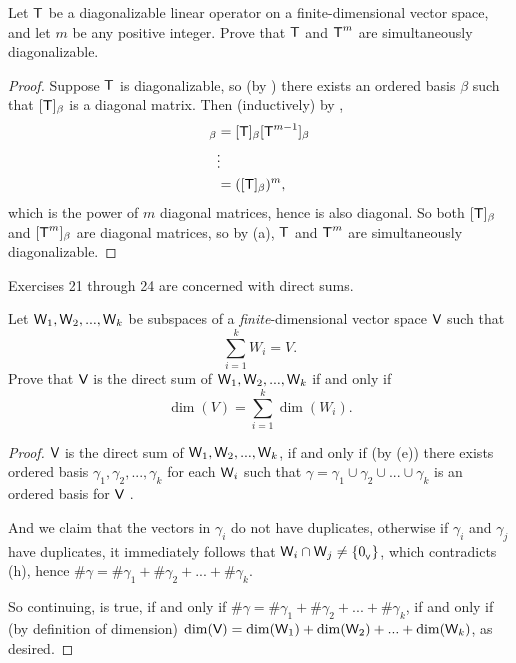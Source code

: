 \begin{exercise} \label{exercise 5.2.20}
Let \(\textsf{T}\) be a diagonalizable linear operator on a finite-dimensional vector space, and let \(m\) be any positive integer.
Prove that \(\textsf{T}\) and \(\textsf{T}^m\) are simultaneously diagonalizable.
\end{exercise}

\begin{proof}
Suppose \(\textsf{T}\) is diagonalizable, so (by ) there exists an ordered basis \(\beta\) such that \([\textsf{T}]_{\beta}\) is a diagonal matrix.
Then (inductively) by ,
\begin{align*}
    [\T^m]_{\beta} & = [\T]_{\beta} [\T^{m - 1}]_{\beta} \\
        & \vdots \\
        & = ([\T]_{\beta})^m,
\end{align*}
which is the power of \(m\) diagonal matrices, hence is also diagonal.
So both \([\textsf{T}]_{\beta}\) and \([\textsf{T}^m]_{\beta}\) are diagonal matrices, so by (a), \(\textsf{T}\) and \(\textsf{T}^m\) are simultaneously diagonalizable.
\end{proof}

Exercises 21 through 24 are concerned with direct sums.

\begin{exercise} \label{exercise 5.2.21}
Let \(\textsf{W}_1, \textsf{W}_2, ..., \textsf{W}_k\) be subspaces of a \emph{finite}-dimensional vector space \(\textsf{V}\) such that
\[
    \sum_{i = 1}^k W_i = V.
\]
Prove that \(\textsf{V}\) is the direct sum of \(\textsf{W}_1, \textsf{W}_2, ..., \textsf{W}_k\) if and only if
\[
    \dim(V) = \sum_{i = 1}^k \dim(W_i).
\]
\end{exercise}

\begin{proof}
\(\textsf{V}\) is the direct sum of \(\textsf{W}_1, \textsf{W}_2, ..., \textsf{W}_k\),
if and only if (by (e)) there exists ordered basis \(\gamma_1, \gamma_2, ..., \gamma_k\) for each \(\textsf{W}_i\) such that \(\gamma = \gamma_1 \cup \gamma_2 \cup ... \cup \gamma_k\) is an ordered basis for \(\textsf{V}\) .

And we claim that the vectors in \(\gamma_i\) do not have duplicates, otherwise if \(\gamma_i\) and \(\gamma_j\) have duplicates, it immediately follows that \(\textsf{W}_i \cap \textsf{W}_j \ne \{ 0_{_{\textsf{V}}} \}\), which contradicts (h), hence \(\#\gamma = \#\gamma_1 + \#\gamma_2 + ... + \#\gamma_k\).

So continuing,  is true, if and only if \(\#\gamma = \#\gamma_1 + \#\gamma_2 + ... + \#\gamma_k\),
if and only if (by definition of dimension) \(\dim(\textsf{V}) = \dim(\textsf{W}_1) + \dim(\textsf{W}_2) + ... + \dim(\textsf{W}_k)\), as desired.
\end{proof}

